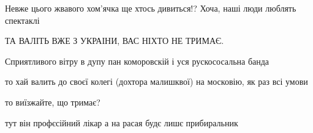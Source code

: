 \begin{itemize}
 
Невже цього жвавого хом'ячка ще хтось дивиться!? Хоча, наші люди люблять спектаклі🤣

 
ТА ВАЛІТЬ ВЖЕ З УКРАІНИ, ВАС НІХТО НЕ ТРИМАЄ.

 
Сприятливого вітру в дупу пан коморовскій і уся рускососальна банда

 
то хай валить до своєї колегі (дохтора малишквої) на московію, як раз всі умови🤣

 
то виїзжайте, що тримає?

 
тут він профєсійний лікар а на расая будє лишє прибиральник

 

\end{itemize}
